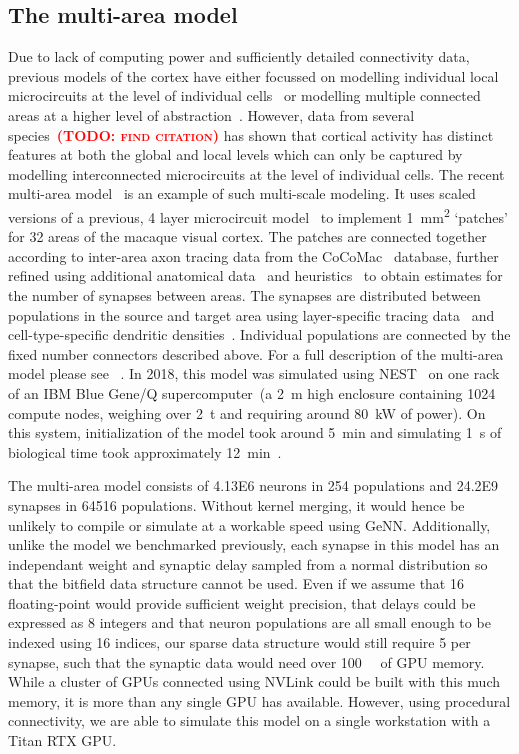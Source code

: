 \documentclass[9pt,twocolumn,twoside,lineno]{pnas-new}
\newcommand{\todo}[1]{\textbf{\textsc{\textcolor{red}{(TODO: #1)}}}}
\begin{document}
\subsection*{The multi-area model}
Due to lack of computing power and sufficiently detailed connectivity data, previous models of the cortex have either focussed on modelling individual local microcircuits at the level of individual cells~\citep{Izhikevich2008,Potjans2012} or modelling multiple connected areas at a higher level of abstraction~\citep{Cabral2014}.
However, data from several species~\todo{find citation} has shown that cortical activity has distinct features at both the global and local levels which can only be captured by modelling interconnected microcircuits at the level of individual cells.
The recent multi-area model~\citep{Schmidt2018a,Schmidt2018} is an example of such multi-scale modeling. It uses scaled versions of a previous, 4 layer microcircuit model~\citep{Potjans2012} to implement \SI{1}{\milli\meter\squared} `patches' for 32 areas of the macaque visual cortex.
The patches are connected together according to inter-area axon tracing data from the CoCoMac~\citep{Bakker2012} database, further refined using additional anatomical data~\citep{Markov2014} and heuristics~\citep{Ercsey-Ravasz2013} to obtain estimates for the number of synapses between areas.
The synapses are distributed between populations in the source and target area using layer-specific tracing data~\citep{Markov2014b} and cell-type-specific dendritic densities~\citep{Binzegger2004}.
Individual populations are connected by the fixed number connectors described above.
For a full description of the multi-area model please see ~\citep{Schmidt2018a,Schmidt2018}.
In 2018, this model was simulated using NEST~\citep{Gewaltig2007} on one rack of an IBM Blue Gene/Q supercomputer~(a \SI{2}{\metre} high enclosure containing \num{1024} compute nodes, weighing over \SI{2}{\tonne} and requiring around \SI{80}{\kilo\watt} of power).
On this system, initialization of the model took around \SI{5}{\minute} and simulating \SI{1}{\second} of biological time took approximately \SI{12}{\minute}~\citep{Schmidt2018}.

The multi-area model consists of \num{4.13E6} neurons in \num{254} populations and \num{24.2E9} synapses in \num{64516} populations. Without kernel merging, it would hence be unlikely to compile or simulate at a workable speed using GeNN.
Additionally, unlike the model we benchmarked previously, each synapse in this model has an independant weight and synaptic delay sampled from a normal distribution so that the bitfield data structure cannot be used.
Even if we assume that \SI{16}{\bit} floating-point would provide sufficient weight precision, that delays could be expressed as \SI{8}{\bit} integers and that neuron populations are all small enough to be indexed using \SI{16}{\bit} indices, our sparse data structure would still require \SI{5}{\byte} per synapse, such that the synaptic data would need over \SI{100}{\giga\byte} of GPU memory.
While a cluster of GPUs connected using NVLink could be built with this much memory, it is more than any single GPU has available.
However, using procedural connectivity, we are able to simulate this model on a single workstation with a Titan RTX GPU.
\end{document}
